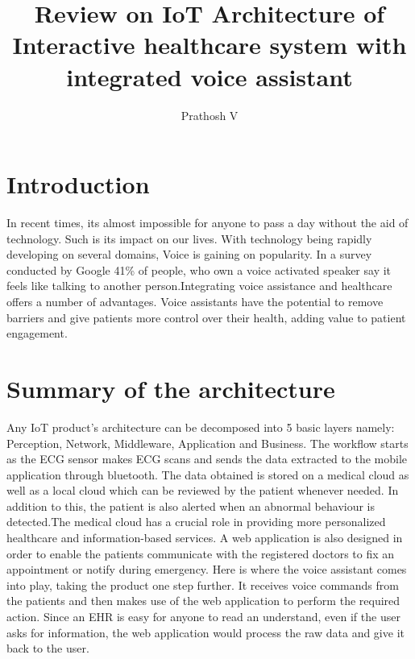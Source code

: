 \documentclass{jpp}
\title{Review on IoT Architecture of Interactive healthcare system with integrated voice assistant}
\author{Prathosh V}
\affiliation{Shiv Nadar University, Chennai}
\begin{document}
\maketitle




\section{Introduction}
In recent times, its almost impossible for anyone to pass a day without the aid of technology. Such is its impact on our lives. With technology being rapidly developing on several domains, Voice is gaining on popularity. In a survey conducted by Google  41\% of people, who own a voice activated speaker say it feels like talking to another person.Integrating voice assistance and healthcare offers a number of advantages. Voice assistants have the potential to remove barriers and give patients more control over their health, adding value to patient
engagement.
 
\section{Summary of the architecture}
Any IoT product's architecture can be decomposed into 5 basic layers namely: Perception, Network, Middleware, Application and Business. The workflow starts as the ECG sensor makes ECG scans and sends the data extracted to the mobile application through bluetooth. The data obtained is stored on a medical cloud as well as a local cloud which can be reviewed by the patient whenever needed. In addition to this, the patient is also alerted when an abnormal behaviour is detected.The medical cloud has a crucial role in providing more personalized healthcare and information-based services. A web application is also designed in order to enable the patients communicate with the registered doctors to fix an appointment or notify during emergency. Here is where the voice assistant comes into play, taking the product one step further. It receives voice commands from the patients and then makes use of the web application to perform the required action. Since an EHR is easy for anyone to read an understand, even if the user asks for information, the web application would process the raw data and give it back to the user.
\end{document}
